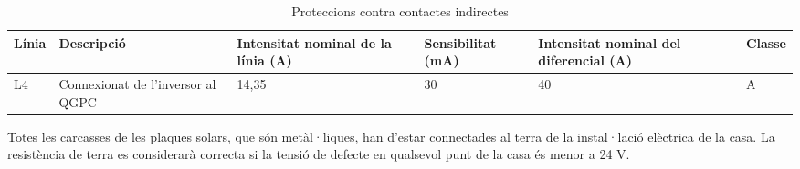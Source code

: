 \begin{table}[H]
\small
\begin{center}
 \begin{tabu} to \textwidth {|X[0.3, l]|X[1, l]|X[0.8, r]|X[0.7 , r]|X[0.7 , r]|X[0.4 , r]|}%
 \hline
 Línia & Descripció & Intensitat nominal de la línia (A) & Sensibilitat (mA) & Intensitat nominal del diferencial (A) & Classe\\ \hline \hline 

L4 & Connexionat de l'inversor al QGPC  & 14,35 & 30 & 40 & A \\ \hline

 \end{tabu}
 \caption{Proteccions contra contactes indirectes}
 \label{tab:ind}
\end{center}
\end{table}

\noindent Totes les carcasses de les plaques solars, que són metàl·liques, han d'estar connectades al terra de la instal·lació elèctrica de la casa. La resistència de terra es considerarà correcta si la tensió de defecte en qualsevol punt de la casa és menor a 24 V.

\clearpage


